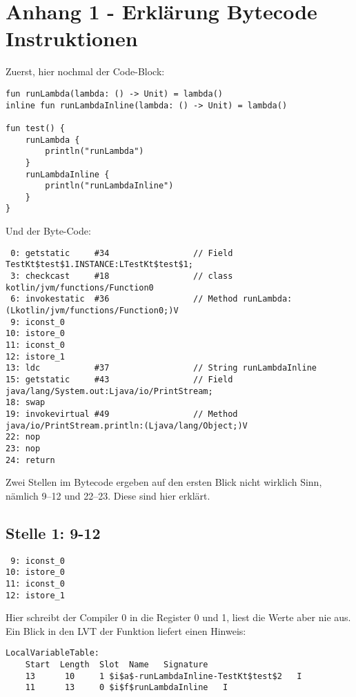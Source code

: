 
\chapter{Anhang 1 - Erklärung Bytecode Instruktionen}\label{ch:anhang-1}

\renewcommand{\kapitelautor}{Autor: Marvin Kurka}

Zuerst, hier nochmal der Code-Block:

\begin{verbatim}
fun runLambda(lambda: () -> Unit) = lambda()
inline fun runLambdaInline(lambda: () -> Unit) = lambda()

fun test() {
    runLambda {
        println("runLambda")
    }
    runLambdaInline {
        println("runLambdaInline")
    }
}
\end{verbatim}

Und der Byte-Code:

\begin{verbatim}
 0: getstatic     #34                 // Field TestKt$test$1.INSTANCE:LTestKt$test$1;
 3: checkcast     #18                 // class kotlin/jvm/functions/Function0
 6: invokestatic  #36                 // Method runLambda:(Lkotlin/jvm/functions/Function0;)V
 9: iconst_0
10: istore_0
11: iconst_0
12: istore_1
13: ldc           #37                 // String runLambdaInline
15: getstatic     #43                 // Field java/lang/System.out:Ljava/io/PrintStream;
18: swap
19: invokevirtual #49                 // Method java/io/PrintStream.println:(Ljava/lang/Object;)V
22: nop
23: nop
24: return
\end{verbatim}

Zwei Stellen im Bytecode ergeben auf den ersten Blick nicht wirklich Sinn, nämlich 9--12 und 22--23.
Diese sind hier erklärt.

\section{Stelle 1: 9-12}

\begin{verbatim}
 9: iconst_0
10: istore_0
11: iconst_0
12: istore_1
\end{verbatim}

Hier schreibt der Compiler 0 in die Register 0 und 1, liest die Werte aber nie aus.
Ein Blick in den LVT der Funktion liefert einen Hinweis:

\begin{verbatim}
LocalVariableTable:
    Start  Length  Slot  Name   Signature
    13      10     1 $i$a$-runLambdaInline-TestKt$test$2   I
    11      13     0 $i$f$runLambdaInline   I
\end{verbatim}

